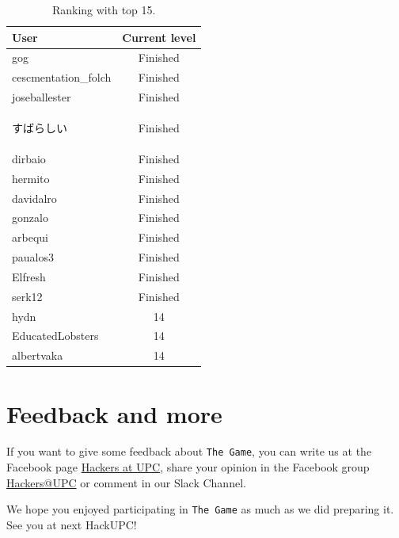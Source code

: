 \documentclass[paper=a4, fontsize=11pt]{scrartcl}	%
\begin{document}
\begin{table}[H]
\centering
  \begin{tabular}{| l || c |}
  \hline User & Current level  \\ \hline  \hline
gog & Finished  \\ \hline
cescmentation\_folch & Finished  \\ \hline
joseballester & Finished  \\ \hline
\begin{CJK}{UTF8}{min}すばらしい\end{CJK} & Finished  \\ \hline
dirbaio & Finished  \\ \hline
hermito & Finished  \\ \hline
davidalro & Finished  \\ \hline
gonzalo & Finished  \\ \hline
arbequi & Finished  \\ \hline
paualos3 & Finished  \\ \hline
Elfresh & Finished  \\ \hline
serk12 & Finished  \\ \hline
hydn & 14  \\ \hline
EducatedLobsters & 14  \\ \hline
albertvaka & 14  \\ \hline
  \end{tabular}
  \caption{Ranking with top 15.} \vspace{3pt}
  \label{tab:ranking}
\end{table}

\section{Feedback and more}
If you want to give some feedback about \texttt{The Game}, you can write us at the Facebook page \href{https://www.facebook.com/hackersatupc/}{Hackers at UPC}, share your opinion in the Facebook group \href{https://www.facebook.com/groups/hackersatupc/}{Hackers@UPC} or comment in our Slack Channel.

We hope you enjoyed participating in \texttt{The Game} as much as we did preparing it. See you at next HackUPC!
\end{document}
